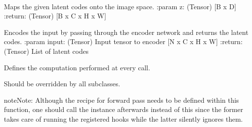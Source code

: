 \documentclass[letterpaper,10pt,english]{sphinxmanual}
\begin{document}
\begin{fulllineitems}
\label{\detokenize{pages/ml:vipercore.ml.models.GolgiVAE}}~

\begin{fulllineitems}
\label{\detokenize{pages/ml:vipercore.ml.models.GolgiVAE.decode}}
\sphinxAtStartPar
Maps the given latent codes
onto the image space.
:param z: (Tensor) {[}B x D{]}
:return: (Tensor) {[}B x C x H x W{]}

\end{fulllineitems}


\begin{fulllineitems}
\label{\detokenize{pages/ml:vipercore.ml.models.GolgiVAE.encode}}
\sphinxAtStartPar
Encodes the input by passing through the encoder network
and returns the latent codes.
:param input: (Tensor) Input tensor to encoder {[}N x C x H x W{]}
:return: (Tensor) List of latent codes

\end{fulllineitems}


\begin{fulllineitems}
\label{\detokenize{pages/ml:vipercore.ml.models.GolgiVAE.forward}}
\sphinxAtStartPar
Defines the computation performed at every call.

\sphinxAtStartPar
Should be overridden by all subclasses.

\begin{sphinxadmonition}{note}{Note:}
\sphinxAtStartPar
Although the recipe for forward pass needs to be defined within
this function, one should call the  instance afterwards
instead of this since the former takes care of running the
registered hooks while the latter silently ignores them.
\end{sphinxadmonition}


\end{fulllineitems}
\end{fulllineitems}
\end{document}
